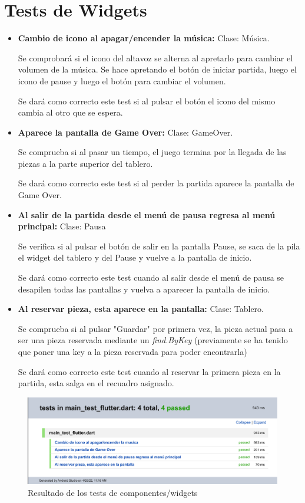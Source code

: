 \documentclass{article}
\begin{document}
\newpage

\section{Tests de Widgets}
\begin{itemize}
\item \textbf{Cambio de icono al apagar/encender la música:} Clase: Música.

Se comprobará si el icono del altavoz se alterna al apretarlo para cambiar el volumen de la música.
Se hace apretando el botón de iniciar partida, luego el icono de pause y luego el botón para cambiar el volumen.

Se dará como correcto este test si al pulsar el botón el icono del mismo cambia al otro que se espera.

\item \textbf{Aparece la pantalla de Game Over:} Clase: GameOver.

Se comprueba si al pasar un tiempo, el juego termina por la llegada de las piezas a la parte
superior del tablero.

Se dará como correcto este test si al perder la partida aparece la pantalla de Game Over.

\item \textbf{Al salir de la partida desde el menú de pausa regresa al menú principal:} Clase: Pausa

Se verifica si al pulsar el botón de salir en la pantalla Pause, se saca de la pila el widget del tablero y del Pause y vuelve a la pantalla de inicio.

Se dará como correcto este test cuando al salir desde el menú de pausa se desapilen todas las pantallas y vuelva a aparecer la pantalla de inicio.

\item \textbf{Al reservar pieza, esta aparece en la pantalla: }Clase: Tablero.

Se comprueba si al pulsar "Guardar" por primera vez, la pieza actual pasa a ser una pieza reservada mediante
un \textit{find.ByKey} (previamente se ha tenido que poner una key a la pieza reservada para poder
encontrarla)

Se dará como correcto este test cuando al reservar la primera pieza en la partida, esta salga en el recuadro asignado.

\end{itemize}

\begin{figure}[H]
      \includegraphics[width=\textwidth]{imagenes/flutter_test.png}
      \caption{Resultado de los tests de componentes/widgets}
\end{figure}
\end{document}
